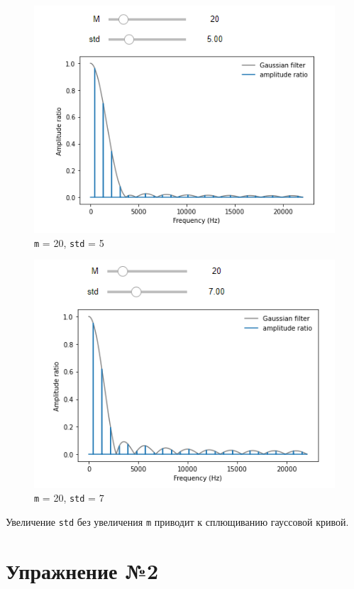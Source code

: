 \documentclass[a4paper, 14pt]{extarticle}
\begin{document}
    \begin{figure}[H]
        \centering
        \includegraphics[width=0.8\linewidth]{gauss_20_5}
        \caption{\texttt{m} = 20, \texttt{std} = 5}
        \label{fig:gauss_20_5}
    \end{figure}

    \begin{figure}[H]
        \centering
        \includegraphics[width=0.8\linewidth]{gauss_20_7}
        \caption{\texttt{m} = 20, \texttt{std} = 7}
        \label{fig:gauss_20_7}
    \end{figure}

    Увеличение \texttt{std} без увеличения \texttt{m} приводит к сплющиванию гауссовой кривой.

    \newpage


    \section{Упражнение №2}
    \label{sec:2}
\end{document}
